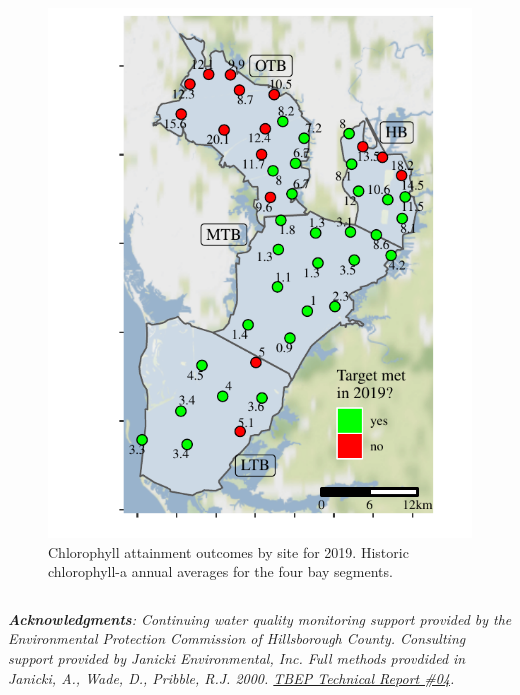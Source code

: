 \documentclass[final,t]{beamer}\usepackage[]{graphicx}\usepackage[]{color}
\begin{document}
\begin{frame}
\begin{columns}[t]
\begin{column}{.63\linewidth}
\begin{columns}[t]
\begin{column}{0.35\textwidth}
\begin{figure}
\centerline{\includegraphics[trim = 0cm 0cm 0cm -1.25cm, width=1\linewidth]{figure/sitemap.pdf}}
\caption{\footnotesize Chlorophyll attainment outcomes by site for 2019. Historic chlorophyll-a annual averages for the four bay segments.}
\label{fig:sitemap}
\end{figure}

\end{column}

\end{columns}

\vspace{-0.25cm}

\footnotesize \textit{\textbf{Acknowledgments}: Continuing water quality monitoring support provided by the Environmental Protection Commission of Hillsborough County.  Consulting support provided by Janicki Environmental, Inc.  Full methods provdided in Janicki, A., Wade, D., Pribble, R.J. 2000. \href{https://www.tbeptech.org/TBEP_TECH_PUBS/2000/TBEP_04_00Chlor-A.pdf}{TBEP Technical Report \#04}.} \\

\end{column}

\end{columns}

\end{frame}
\end{document}
